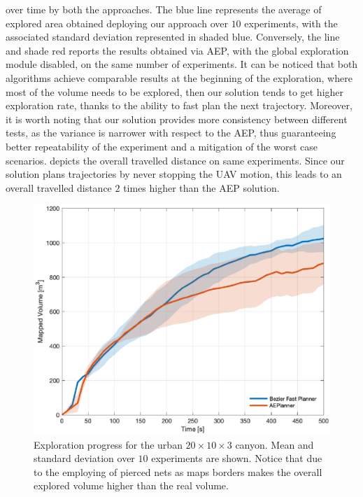 over time by both the approaches. The blue line represents the average of explored area obtained deploying our approach over $10$
experiments, with the associated standard deviation represented in shaded blue. Conversely, the line and shade red reports the
results obtained via AEP, with the global exploration module disabled, on the same number of experiments. It can be noticed that
both algorithms achieve comparable results at the beginning of the exploration, where most of the volume needs to be explored,
then our solution tends to get higher exploration rate, thanks to the ability to fast plan the next trajectory. Moreover, it is
worth noting that our solution provides more consistency between different tests, as the variance is narrower with respect to the AEP,
thus guaranteeing better repeatability of the experiment and a mitigation of the worst case scenarios.
 depicts the overall travelled distance on same experiments. Since our solution plans
trajectories by never stopping the UAV motion, this leads to an overall travelled distance $2$ times higher than the AEP solution.
\begin{figure}[!t]
	\centering
	\includegraphics[trim={0cm 0cm 0cm 1cm}, clip = true, scale=.4]{Figs/Chapter4/mapped_volume.eps}
	\caption{Exploration progress for the urban $20 \times 10 \times 3$ canyon. Mean and standard deviation over $10$
	experiments are shown. Notice that due to the employing of pierced nets as maps borders makes the overall explored
	volume higher than the real volume.}%
	\label{FIG:EXPLORATION-COMPARED-ALGOROTHMS}
\end{figure}
